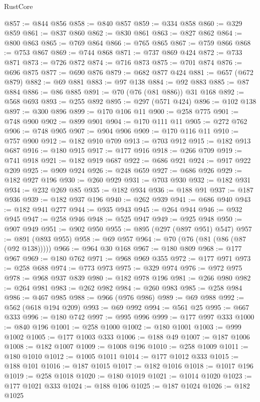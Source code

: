 \begin{lexlean}{RustCore}
\begin{coremodule}
@857 := @844 @856
@858 := @840 @857
@859 := @334 @858
@860 := @329 @859
@861 := @837 @860
@862 := @830 @861
@863 := @827 @862
@864 := @800 @863
@865 := @769 @864
@866 := @765 @865
@867 := @759 @866
@868 := @753 @867
@869 := @744 @868
@871 := @737 @869 @424
@872 := @733 @871
@873 := @726 @872
@874 := @716 @873
@875 := @701 @874
@876 := @696 @875
@877 := @690 @876
@879 := @682 @877 @424
@881 := @657 (@672 @879)
@882 := @69 @881
@883 := @97 @138
@884 := @92 @883
@885 := @87 @884
@886 := @86 @885
@891 := @70 (@76 (@81 @886)) @31 @168
@892 := @568 @693
@893 := @255 @892
@895 := @297 (@571 @424)
@896 := @102 @138
@897 := @300 @896
@899 := @170 @106 @11
@900 := @258 @775
@901 := @748 @900
@902 := @899 @901
@904 := @170 @111 @11
@905 := @272 @762
@906 := @748 @905
@907 := @904 @906
@909 := @170 @116 @11
@910 := @757 @900
@912 := @182 @910 @709
@913 := @703 @912
@915 := @182 @913 @687
@916 := @180 @915
@917 := @177 @916
@918 := @266 @709
@919 := @741 @918
@921 := @182 @919 @687
@922 := @686 @921
@924 := @917 @922 @209
@925 := @909 @924
@926 := @248 @659
@927 := @686 @926
@929 := @182 @927 @196
@930 := @260 @929
@931 := @703 @930
@932 := @182 @931
@934 := @232 @269 @85
@935 := @182 @934
@936 := @188 @91
@937 := @187 @936
@939 := @182 @937 @196
@940 := @262 @939
@941 := @686 @940
@943 := @182 @941 @277
@944 := @935 @943
@945 := @264 @944
@946 := @932 @945
@947 := @258 @946
@948 := @525 @947
@949 := @925 @948
@950 := @907 @949
@951 := @902 @950
@955 := @895 (@297 (@897 @951) @547)
@957 := @891 (@893 @955)
@958 := @69 @957
@964 := @70 (@76 (@81 (@86 (@87 (@92 @138)))))
@966 := @964 @30 @168
@967 := @180 @809
@968 := @177 @967
@969 := @180 @762
@971 := @968 @969 @355
@972 := @177 @971
@973 := @258 @688
@974 := @773 @973
@975 := @329 @974
@976 := @972 @975
@978 := @968 @937 @839
@980 := @182 @978 @196
@981 := @266 @980
@982 := @264 @981
@983 := @262 @982
@984 := @260 @983
@985 := @258 @984
@986 := @467 @985
@988 := @966 (@976 @986)
@989 := @69 @988
@992 := @562 (@618 @194 @209)
@993 := @69 @992
@994 := @561 @25
@995 := @667 @333
@996 := @180 @742
@997 := @995 @996
@999 := @177 @997 @333
@1000 := @840 @196
@1001 := @258 @1000
@1002 := @180 @1001
@1003 := @999 @1002
@1005 := @177 @1003 @333
@1006 := @188 @49
@1007 := @187 @1006
@1008 := @182 @1007
@1009 := @1008 @196
@1010 := @258 @1009
@1011 := @180 @1010
@1012 := @1005 @1011
@1014 := @177 @1012 @333
@1015 := @188 @101
@1016 := @187 @1015
@1017 := @182 @1016
@1018 := @1017 @196
@1019 := @258 @1018
@1020 := @180 @1019
@1021 := @1014 @1020
@1023 := @177 @1021 @333
@1024 := @188 @106
@1025 := @187 @1024
@1026 := @182 @1025

\end{coremodule}
\end{lexlean}
